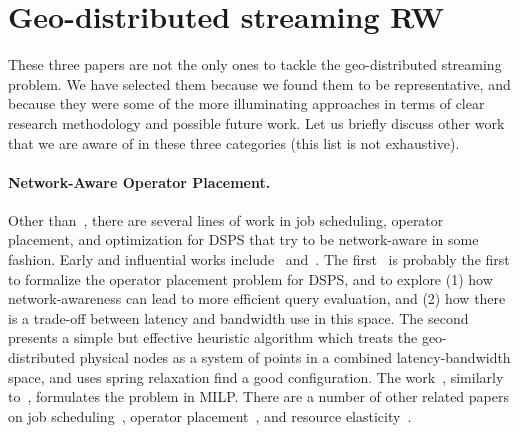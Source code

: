 \section{Geo-distributed streaming RW}

These three papers are not the only ones to tackle the geo-distributed streaming problem. We have selected them because we found them to be representative, and because they were some of the more illuminating approaches in terms of clear research methodology and possible future work.
Let us briefly discuss other work that we are aware of in these three categories (this list is not exhaustive).

\paragraph{Network-Aware Operator Placement.}
Other than~, there are several lines of work in job scheduling, operator placement, and optimization for DSPS that try to be network-aware in some fashion. Early and influential works include~\cite{ahmad2004network} and~\cite{pietzuch2006network}.
The first~\cite{ahmad2004network} is probably the first to formalize the operator placement problem for DSPS, and to explore (1) how network-awareness can lead to more efficient query evaluation, and (2) how there is a trade-off between latency and bandwidth use in this space.
The second~\cite{pietzuch2006network} presents a simple but effective heuristic algorithm which treats the geo-distributed physical nodes as a system of points in a combined latency-bandwidth space, and uses spring relaxation find a good configuration.
The work~\cite{gu2015general}, similarly to~, formulates the problem in MILP.
There are a number of other related papers on job scheduling~\cite{aniello2013adaptive,xu2014tstorm,eidenbenz2016task,wolf2008soda,fu2019edgewise}, operator placement~\cite{bonfils2004adaptive,tziritas2016improving,rizou2010solving,lakshmanan2008placement},
and resource elasticity~\cite{cardellini2018decentralized,hochreiner2016elastic,cardellini2018optimal,dias2018dsp-survey}.

